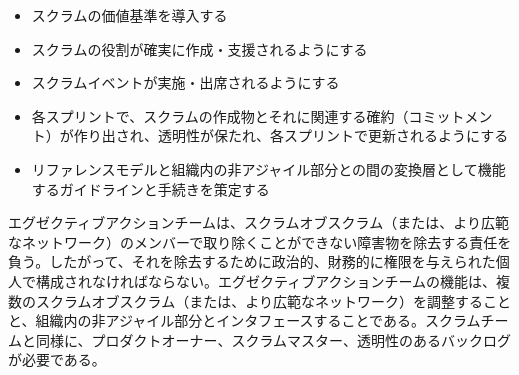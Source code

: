 \documentclass[12pt,a4paper,parskip=full]{scrartcl}
\begin{document}
\begin{itemize}
\itemsep1pt\parskip0pt

\item
スクラムの価値基準を導入する
\item
スクラムの役割が確実に作成・支援されるようにする
\item
スクラムイベントが実施・出席されるようにする
\item
各スプリントで、スクラムの作成物とそれに関連する確約（コミットメント）が作り出され、透明性が保たれ、各スプリントで更新されるようにする
\item
リファレンスモデルと組織内の非アジャイル部分との間の変換層として機能するガイドラインと手続きを策定する
\end{itemize}

エグゼクティブアクションチームは、スクラムオブスクラム（または、より広範なネットワーク）のメンバーで取り除くことができない障害物を除去する責任を負う。したがって、それを除去するために政治的、財務的に権限を与えられた個人で構成されなければならない。エグゼクティブアクションチームの機能は、複数のスクラムオブスクラム（または、より広範なネットワーク）を調整することと、組織内の非アジャイル部分とインタフェースすることである。スクラムチームと同様に、プロダクトオーナー、スクラムマスター、透明性のあるバックログが必要である。
\end{document}
